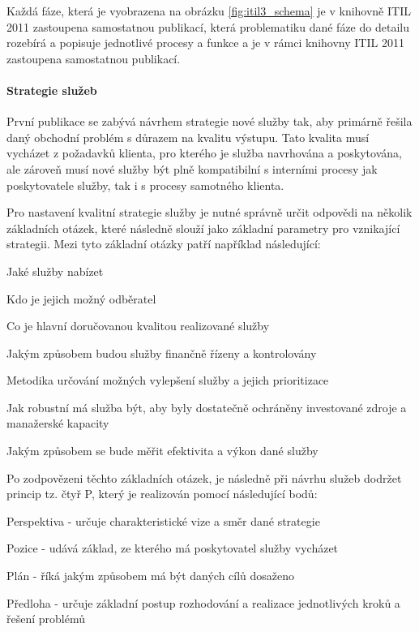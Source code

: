 \documentclass[
  digital,     %
  twoside,     %
  lof,         %
  lot,         %
]{fithesis4}
\begin{document}
Každá fáze, která je vyobrazena na obrázku \ref{fig:itil3_schema} je v knihovně ITIL 2011 zastoupena samostatnou publikací, která problematiku dané fáze do detailu rozebírá a popisuje jednotlivé procesy a funkce a je v rámci knihovny ITIL 2011 zastoupena samostatnou publikací. 
\paragraph{Strategie služeb}
První publikace se zabývá návrhem strategie nové služby tak, aby primárně řešila daný obchodní problém s důrazem na kvalitu výstupu. Tato kvalita musí vycházet z požadavků klienta, pro kterého je služba navrhována a poskytována, ale zároveň musí nové služby být plně kompatibilní s interními procesy jak poskytovatele služby, tak i s procesy samotného klienta.\parencite[s.~12-13]{Carlidge2007}

Pro nastavení kvalitní strategie služby je nutné správně určit odpovědi na několik základních otázek, které následně slouží jako základní parametry pro vznikající strategii.\parencite[s.~32]{Matula2017} Mezi tyto základní otázky patří například následující:

\begin{compactitem}
  \item Jaké služby nabízet
  \item Kdo je jejich možný odběratel
  \item Co je hlavní doručovanou kvalitou realizované služby
  \item Jakým způsobem budou služby finančně řízeny a kontrolovány
  \item Metodika určování možných vylepšení služby a jejich prioritizace
  \item Jak robustní má služba být, aby byly dostatečně ochráněny investované zdroje a manažerské kapacity
  \item Jakým způsobem se bude měřit efektivita a výkon dané služby
\end{compactitem}

Po zodpovězeni těchto základních otázek, je následně při návrhu služeb dodržet princip tz. čtyř P, který je realizován pomocí následující bodů:\parencite[s.~13]{Carlidge2007}
\begin{compactitem}
    \item Perspektiva - určuje charakteristické vize a směr dané strategie
    \item Pozice - udává základ, ze kterého má poskytovatel služby vycházet
    \item Plán - říká jakým způsobem má být daných cílů dosaženo
    \item Předloha - určuje základní postup rozhodování a realizace jednotlivých kroků a řešení problémů
\end{compactitem}
\end{document}
